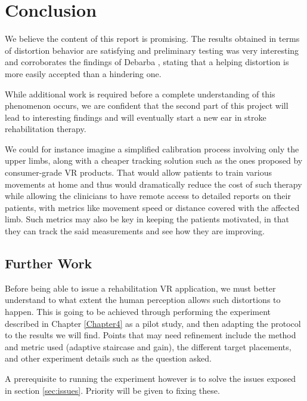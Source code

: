 
\chapter{Conclusion} %

\label{Chapter6}

We believe the content of this report is promising. The results obtained in terms of distortion behavior are satisfying and preliminary testing was very interesting and corroborates the findings of Debarba \cite{debarba2017embodiment}, stating that a helping distortion is more easily accepted than a hindering one.

While additional work is required before a complete understanding of this phenomenon occurs, we are confident that the second part of this project will lead to interesting findings and will eventually start a new ear in stroke rehabilitation therapy.

We could for instance imagine a simplified calibration process involving only the upper limbs, along with a cheaper tracking solution such as the ones proposed by consumer-grade VR products. That would allow patients to train various movements at home and thus would dramatically reduce the cost of such therapy while allowing the clinicians to have remote access to detailed reports on their patients, with metrics like movement speed or distance covered with the affected limb. Such metrics may also be key in keeping the patients motivated, in that they can track the said measurements and see how they are improving.

\section{Further Work}

Before being able to issue a rehabilitation VR application, we must better understand to what extent the human perception allows such distortions to happen. This is going to be achieved through performing the experiment described in Chapter \ref{Chapter4} as a pilot study, and then adapting the protocol to the results we will find. Points that may need refinement include the method and metric used (adaptive staircase and gain), the different target placements, and other experiment details such as the question asked.

A prerequisite to running the experiment however is to solve the issues exposed in section \ref{sec:issues}. Priority will be given to fixing these.

